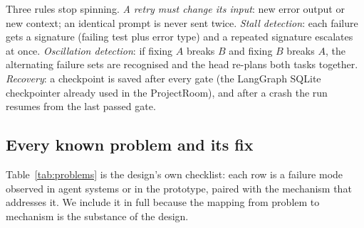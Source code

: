 Three rules stop spinning. \emph{A retry must change its input}: new error output or new context; an identical prompt is never sent twice. \emph{Stall detection}: each failure gets a signature (failing test plus error type) and a repeated signature escalates at once. \emph{Oscillation detection}: if fixing $A$ breaks $B$ and fixing $B$ breaks $A$, the alternating failure sets are recognised and the head re-plans both tasks together. \emph{Recovery}: a checkpoint is saved after every gate (the LangGraph SQLite checkpointer already used in the ProjectRoom), and after a crash the run resumes from the last passed gate.

\subsection{Every known problem and its fix}

Table~\ref{tab:problems} is the design's own checklist: each row is a failure mode observed in agent systems or in the prototype, paired with the mechanism that addresses it. We include it in full because the mapping from problem to mechanism is the substance of the design.

